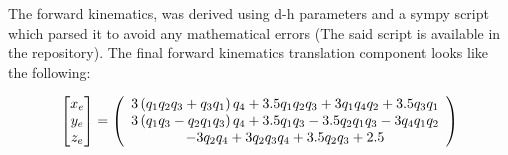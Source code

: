 \documentclass{report}
\let\cos\relax
\let\sin\relax
\newcommand{\sin}[1]{\mathit{S}_{#1}}
\newcommand{\cos}[1]{\mathit{C}_{#1}}
\begin{document}
The forward kinematics, was derived using d-h parameters and a sympy script which parsed it to avoid any mathematical errors (The said script is available in the repository). The final forward kinematics translation component looks like the following:

\begin{equation*}
\begin{bmatrix}
           x_{e} \\
           y_{e} \\
           z_{e}
\end{bmatrix} = 
\left(\begin{array}{c} %
    3 \left(\sin{q_{1}} \sin{q_{2}} \cos{q_{3}} + \sin{q_{3}} \cos{q_{1}}\right) \cos{q_{4}}  %
    + 3.5 \sin{q_{1}} \sin{q_{2}} \cos{q_{3}} %
    + 3 \sin{q_{1}} \sin{q_{4}} \cos{q_{2} } %
    + 3.5 \sin{q_{3}} \cos{q_{1}} %
    \\
    3 \left(\sin{q_{1}} \sin{q_{3}} %
    - \sin{q_{2}} \cos{q_{1}} \cos{q_{3}}\right) \cos{q_{4}} %
    + 3.5 \sin{q_{1}} \sin{q_{3}} %
    - 3.5 \sin{q_{2}} \cos{q_{1}} \cos{q_{3}} %
    - 3 \sin{q_{4}} \cos{q_{1}} \cos{q_{2}} %
    \\
    - 3 \sin{q_{2}} \sin{q_{4}} %
    + 3 \cos{q_{2}} \cos{q_{3}} \cos{q_{4}} %
    + 3.5 \cos{q_{2}} \cos{q_{3}} + 2.5
    \end{array}\right)
\end{equation*}
\end{document}
